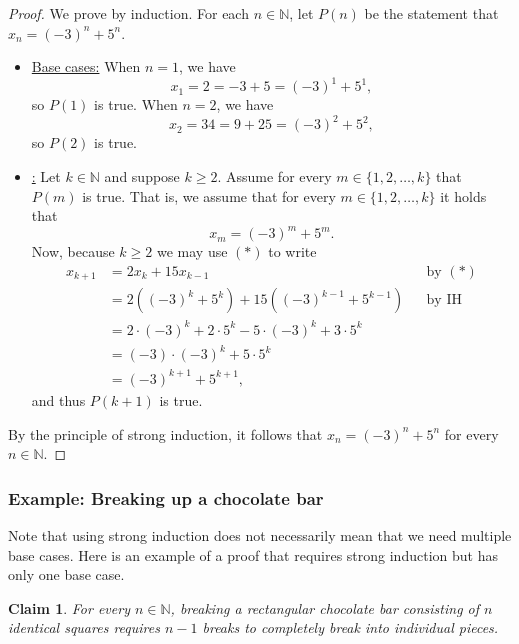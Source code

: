 \documentclass[11pt]{article}
\theoremstyle{plain}
\newtheorem*{claim}{Claim}
\theoremstyle{plain}
\theoremstyle{remark}
\def\naturals{\mathbb{N}}
\begin{document}
\begin{proof}
 We prove by induction. For each $n\in\naturals$,  let  $P(n)$ be the statement that $x_n = (-3)^n  + 5^{n}$. 
 \begin{itemize}
  \item\underline{Base cases:} When $n=1$, we have
  \[
   x_1 = 2 = -3 + 5 = (-3)^1 + 5^1,
  \]
  so $P(1)$ is true. When $n=2$, we have
  \[
   x_2 = 34 = 9 + 25 = (-3)^2 + 5^2,
  \]
  so $P(2)$ is true.
\item\underline{:} Let $k\in\naturals$ and suppose $k\geq 2$.  Assume for every $m\in\{1,2,\dots,k\}$ that $P(m)$ is true. That is, we assume that for every $m\in\{1,2,\dots,k\}$ it holds that
\[
 x_m = (-3)^m  + 5^{m}. \tag{IH}
\]
Now, because $k\geq2$ we may use $(\ast)$ to write
\begin{align*}
 x_{k+1} &= 2x_k + 15x_{k-1} &&\text{by }(\ast)\\ 
  & = 2\left((-3)^k  + 5^{k}\right)  + 15\left((-3)^{k-1}  + 5^{k-1}\right) &&\text{by IH}\\
  & = 2\cdot (-3)^k + 2\cdot 5^k - 5\cdot (-3)^k + 3\cdot 5^k\\
  & = (-3)\cdot(-3)^k + 5\cdot 5^k\\\
  & = (-3)^{k+1}  + 5^{k+1},
\end{align*}
 and thus $P(k+1)$ is true.
 \end{itemize}
By the principle of strong induction, it follows that $x_n = (-3)^n  + 5^{n}$ for every $n\in\naturals$.
\end{proof}

\subsubsection*{Example: Breaking up a chocolate bar}
Note that using strong induction does not necessarily mean that we need multiple base cases. Here is an example of a proof that requires strong induction but has only one base case.

\begin{tcolorbox}
\begin{claim}
For every $n\in\naturals$, breaking a rectangular chocolate bar consisting of $n$ identical squares requires $n-1$ breaks to completely break into individual pieces.
\end{claim}
\end{tcolorbox}
 
 
 
\end{document}
